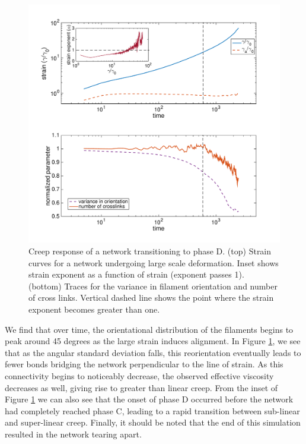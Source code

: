 \documentclass[pre,preprint]{revtex4-1}
\begin{document}
\begin{figure}[h!]
\centering
\includegraphics[width=\hsize]{tearer}
\caption{\label{fig:tearer} Creep response of a network transitioning to phase D. (top)  Strain curves for a network undergoing large scale deformation.  Inset shows strain exponent as a function of strain (exponent passes 1).  (bottom)  Traces for the variance in filament orientation and number of cross links.  Vertical dashed line shows the point where the strain exponent becomes greater than one.}
\end{figure}

We find that over time, the orientational distribution of the filaments begins to peak around 45 degrees as the large strain induces alignment.  In Figure \ref{fig:tearer}, we see that as the angular standard deviation falls, this reorientation eventually leads to fewer bonds bridging the network perpendicular to the line of strain.  As this connectivity begins to noticeably decrease, the observed effective viscosity decreases as well, giving rise to greater than linear creep.  From the inset of Figure \ref{fig:tearer} we can also see that the onset of phase D occurred before the network had completely reached phase C, leading to a rapid transition between sub-linear and super-linear creep.  Finally, it should be noted that the end of this simulation resulted in the network tearing apart.  
\end{document}
